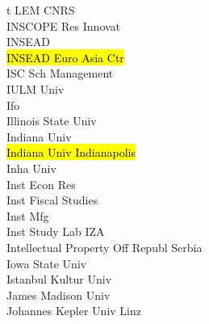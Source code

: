 \documentclass[a4paper]{article}
\begin{document}
\begin{multicols*}{2}
\begin{footnotesize}
t LEM CNRS \\ INSCOPE Res Innovat \\ INSEAD \\ \hl{INSEAD Euro Asia Ctr} \\ ISC Sch Management \\ IULM Univ \\ Ifo \\ Illinois State Univ \\ Indiana Univ \\ \hl{Indiana Univ Indianapolis} \\ Inha Univ \\ Inst Econ Res \\ Inst Fiscal Studies \\ Inst Mfg \\ Inst Study Lab IZA \\ Intellectual Property Off Republ Serbia \\ Iowa State Univ \\ Istanbul Kultur Univ \\ James Madison Univ \\ Johannes Kepler Univ Linz \
\end{footnotesize}
\end{multicols*}
\end{document}
